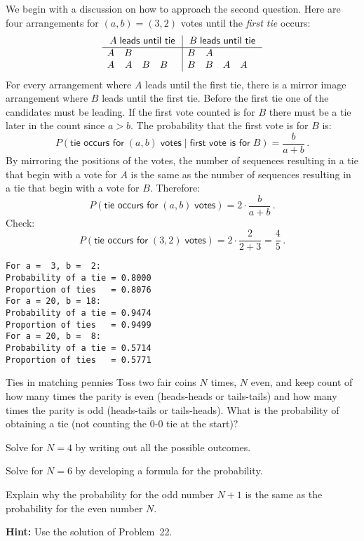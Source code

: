 We begin with a discussion on how to approach the second question. Here are four arrangements for $(a,b)=(3,2)$ votes until the \emph{first tie} occurs:
\[
\begin{array}{rrrrr|rrrrr}
\multicolumn{5}{c|}{A \;\textsf{leads until tie}} &
\multicolumn{5}{c}{B \;\textsf{leads until tie}}\\\hline
A & B &&& &B & A & & &\\
A & A & B & B && B & B & A & A&\\
\end{array}
\]
For every arrangement where $A$ leads until the first tie, there is a mirror image arrangement where $B$ leads until the first tie. Before the first tie one of the candidates must be leading. If the first vote counted is for $B$ there must be a tie later in the count since $a>b$. The probability that the first vote is for $B$ is:
\[
P(\textsf{tie occurs for}\;(a,b)\;\textsf{votes} \;|\; \textsf{first vote is for}\;B)=\frac{b}{a+b}\,.
\]
By mirroring the positions of the votes, the number of sequences resulting in a tie that begin with a vote for $A$ is the same as the number of sequences resulting in a tie that begin with a vote for $B$. Therefore:
\[
P(\textsf{tie occurs for}\;(a,b)\;\textsf{votes})=2\cdot\frac{b}{a+b}\,.
\]
Check:
\[
P(\textsf{tie occurs for}\;(3,2)\;\textsf{votes})=2\cdot\frac{2}{2+3}=\frac{4}{5}\,.
\]

\sml{}
\begin{verbatim}
For a =  3, b =  2:
Probability of a tie = 0.8000
Proportion of ties   = 0.8076
For a = 20, b = 18:
Probability of a tie = 0.9474
Proportion of ties   = 0.9499
For a = 20, b =  8:
Probability of a tie = 0.5714
Proportion of ties   = 0.5771
\end{verbatim}



\begin{prob}{Ties in matching pennies}
Toss two fair coins $N$ times, $N$ even, and keep count of how many times the parity is even (heads-heads or tails-tails) and how many times the parity is odd (heads-tails or tails-heads). What is the probability of obtaining a tie (not counting the $0$-$0$ tie at the start)?

 Solve for $N=4$ by writing out all the possible outcomes.

 Solve for $N=6$ by developing a formula for the probability.


 Explain why the probability for the odd number $N+1$ is the same as the probability for the even number $N$.

\textbf{Hint:} Use the solution of Problem~22.
\end{prob}

